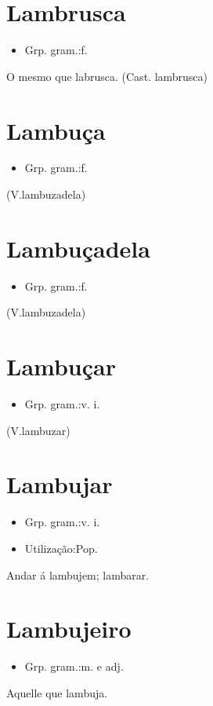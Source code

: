 \section{Lambrusca}
\begin{itemize}
\item {Grp. gram.:f.}
\end{itemize}
O mesmo que \textunderscore labrusca\textunderscore .
(Cast. \textunderscore lambrusca\textunderscore )
\section{Lambuça}
\begin{itemize}
\item {Grp. gram.:f.}
\end{itemize}
(V.lambuzadela)
\section{Lambuçadela}
\begin{itemize}
\item {Grp. gram.:f.}
\end{itemize}
(V.lambuzadela)
\section{Lambuçar}
\begin{itemize}
\item {Grp. gram.:v. i.}
\end{itemize}
(V.lambuzar)
\section{Lambujar}
\begin{itemize}
\item {Grp. gram.:v. i.}
\end{itemize}
\begin{itemize}
\item {Utilização:Pop.}
\end{itemize}
Andar á lambujem; lambarar.
\section{Lambujeiro}
\begin{itemize}
\item {Grp. gram.:m.  e  adj.}
\end{itemize}
Aquelle que lambuja.
